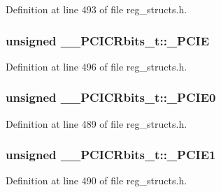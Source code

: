 Definition at line 493 of file reg\+\_\+structs.\+h.

\hypertarget{union_____p_c_i_c_rbits__t_adc56ab50cc65cb78e3bc45288ad72b8f}{
\subsubsection[{\+\_\+\+P\+C\+I\+E}]{\setlength{\rightskip}{0pt plus 5cm}unsigned \+\_\+\+\_\+\+P\+C\+I\+C\+Rbits\+\_\+t\+::\+\_\+\+P\+C\+I\+E}}\label{union_____p_c_i_c_rbits__t_adc56ab50cc65cb78e3bc45288ad72b8f}


Definition at line 496 of file reg\+\_\+structs.\+h.

\hypertarget{union_____p_c_i_c_rbits__t_a817692e087a6d55c58373af44f6dc26f}{
\subsubsection[{\+\_\+\+P\+C\+I\+E0}]{\setlength{\rightskip}{0pt plus 5cm}unsigned \+\_\+\+\_\+\+P\+C\+I\+C\+Rbits\+\_\+t\+::\+\_\+\+P\+C\+I\+E0}}\label{union_____p_c_i_c_rbits__t_a817692e087a6d55c58373af44f6dc26f}


Definition at line 489 of file reg\+\_\+structs.\+h.

\hypertarget{union_____p_c_i_c_rbits__t_a6ae0886986898b4bede2a5f3f3d17099}{
\subsubsection[{\+\_\+\+P\+C\+I\+E1}]{\setlength{\rightskip}{0pt plus 5cm}unsigned \+\_\+\+\_\+\+P\+C\+I\+C\+Rbits\+\_\+t\+::\+\_\+\+P\+C\+I\+E1}}\label{union_____p_c_i_c_rbits__t_a6ae0886986898b4bede2a5f3f3d17099}


Definition at line 490 of file reg\+\_\+structs.\+h.

